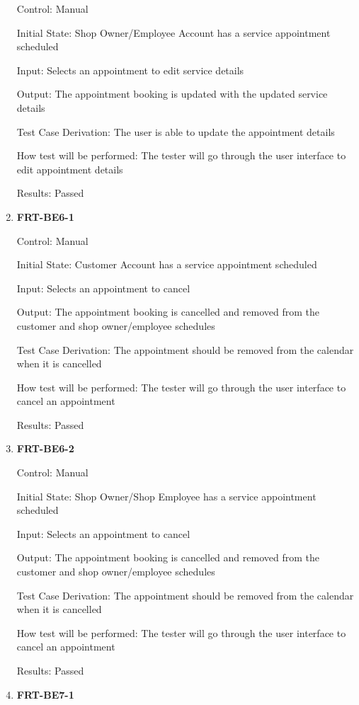 \documentclass[12pt, titlepage]{article}
\begin{document}
\begin{enumerate}
	      Control: Manual

	      Initial State: Shop Owner/Employee Account has a service appointment scheduled

	      Input: Selects an appointment to edit service details

	      Output: The appointment booking is updated with the updated service details

	      Test Case Derivation: The user is able to update the appointment details

	      How test will be performed: The tester will go through the user interface to edit appointment
	      details

	      Results: Passed

	\item \textbf{FRT-BE6-1}

	      Control: Manual

	      Initial State: Customer Account has a service appointment scheduled

	      Input: Selects an appointment to cancel

	      Output: The appointment booking is cancelled and removed from the customer and shop owner/employee
	      schedules

	      Test Case Derivation: The appointment should be removed from the calendar when it is cancelled

	      How test will be performed: The tester will go through the user interface to cancel an appointment

	      Results: Passed

	\item \textbf{FRT-BE6-2}

	      Control: Manual

	      Initial State: Shop Owner/Shop Employee has a service appointment scheduled

	      Input: Selects an appointment to cancel

	      Output: The appointment booking is cancelled and removed from the customer and shop owner/employee
	      schedules

	      Test Case Derivation: The appointment should be removed from the calendar when it is cancelled

	      How test will be performed: The tester will go through the user interface to cancel an appointment

	      Results: Passed

	\item \textbf{FRT-BE7-1}


\end{enumerate}
\end{document}
